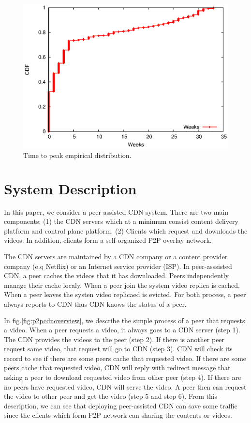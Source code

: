 \documentclass[conference]{IEEEtran}
\begin{document}
\begin{figure}[thb]
\begin{center}
\includegraphics[scale=0.6]{graphs/timetopeak.eps}
\end{center}
\caption{Time to peak empirical distribution.}
\label{fig:timetopeak}
\vspace{-2mm}
\end{figure} 

\section{System Description}\label{systemdescription}
In this paper, we consider a peer-assisted CDN system. 
There are two main components: (1) the CDN servers which at a minimum consist content delivery platform and control plane platform. 
(2) Clients which request and downloads the videos.
In addition, clients form a self-organized P2P overlay network.

The CDN servers are maintained by a CDN company or a content provider company (e.q Netflix) or an Internet service provider (ISP).
In peer-asssisted CDN, a peer caches the videos that it has downloaded.
Peers independently manage their cache localy.
When a peer join the system video replica is cached.
When a peer leaves the systen video replicaed is evicted. 
For both process, a peer always reports to CDN thus CDN knows the status of a peer.

In fig.\ref{fig:p2pcdnoverview}, we describe the simple process of a peer that requests a video.  
When a peer requests a video, it always goes to a CDN server (step 1). 
The CDN provides the videos to the peer (step 2). 
If there is another peer request same video, that request will go to CDN (step 3).  
CDN will check its record to see if there are some peers cache that requested video.  
If there are some peers cache that requested video, CDN will reply with redirect message that asking a peer to download requested video from other peer (step 4).
If there are no peers have requested video, CDN will serve the video.   
A peer then can request the video to other peer and get the video (step 5 and step 6).
From this description, we can see that deploying peer-assisted CDN can save some traffic since the clients which form P2P network can sharing the contents or videos. 
\end{document}
